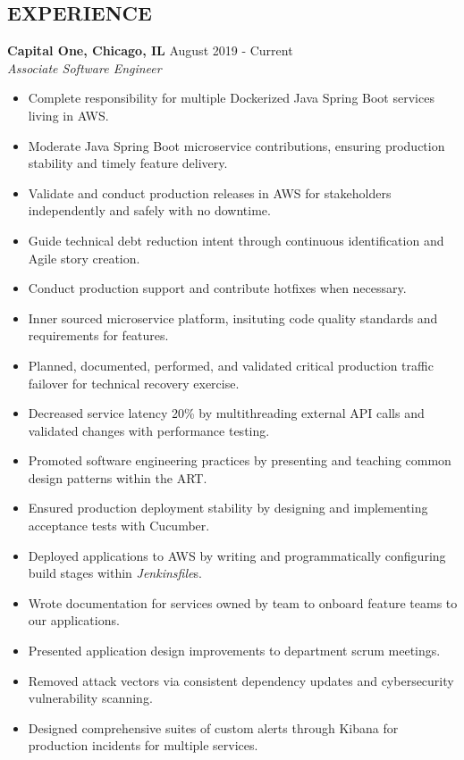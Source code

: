 \documentclass[overlapped]{res}
\begin{document}
\begin{resume}
\section{EXPERIENCE}
\textbf{Capital One, Chicago, IL} \hfill August 2019 - Current \\
{\sl Associate Software Engineer}
\begin{itemize}  \itemsep -2pt %
    \item Complete responsibility for multiple Dockerized Java Spring Boot services living in AWS.
    \item Moderate Java Spring Boot microservice contributions, ensuring production stability and timely feature delivery. %
    \item Validate and conduct production releases in AWS for stakeholders independently and safely with no downtime.
    \item Guide technical debt reduction intent through continuous identification and Agile story creation.
    \item Conduct production support and contribute hotfixes when necessary.
    \item Inner sourced microservice platform, insituting code quality standards and requirements for features.
    \item Planned, documented, performed, and validated critical production traffic failover for technical recovery exercise. 
    \item Decreased service latency 20\% by multithreading external
    API calls and validated changes with performance testing.
    \item Promoted software engineering practices by presenting and teaching common design patterns within the ART. 
    \item Ensured production deployment stability by designing 
    and implementing acceptance tests with Cucumber.
    \item Deployed applications to AWS by
    writing and programmatically configuring build stages within {\it Jenkinsfile}s.
    \item Wrote documentation for services owned by team
    to onboard feature teams to our applications.
    \item Presented application design improvements to department scrum
    meetings.
    \item Removed attack vectors via consistent dependency updates and cybersecurity vulnerability scanning.
    \item Designed comprehensive suites of custom alerts through Kibana
    for production incidents for multiple services.
\end{itemize}


\end{resume}
\end{document}
